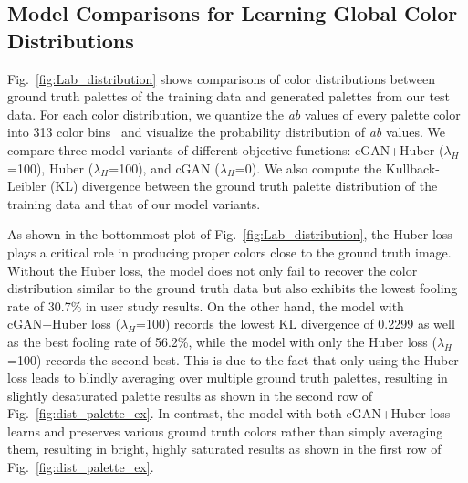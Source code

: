 \documentclass[runningheads]{llncs}
\begin{document}
\subsection{Model Comparisons for Learning Global Color Distributions}
Fig.~\ref{fig:Lab_distribution} shows comparisons of color distributions between ground truth palettes of the training data and generated palettes from our test data. For each color distribution, we quantize the \emph{ab} values of every palette color into 313 color bins~\cite{zhang2016colorful} and visualize the probability distribution of \emph{ab} values. We compare three model variants of different objective functions: cGAN+Huber ($\lambda_{H}$=100), Huber ($\lambda_{H}$=100), and cGAN ($\lambda_{H}$=0). We also compute the Kullback-Leibler (KL) divergence between the ground truth palette distribution of the training data and that of our model variants. 

As shown in the bottommost plot of Fig.~\ref{fig:Lab_distribution}, the Huber loss plays a critical role in producing proper colors close to the ground truth image. Without the Huber loss, the model does not only fail to recover the color distribution similar to the ground truth data but also exhibits the lowest fooling rate of 30.7\% in user study results. On the other hand, the model with cGAN+Huber loss ($\lambda_{H}$=100) records the lowest KL divergence of 0.2299 as well as the best fooling rate of 56.2\%, while the model with only the Huber loss ($\lambda_{H}$=100) records the second best. This is due to the fact that only using the Huber loss leads to blindly averaging over multiple ground truth palettes, resulting in slightly desaturated palette results as shown in the second row of Fig.~\ref{fig:dist_palette_ex}. In contrast, the model with both cGAN+Huber loss learns and preserves various ground truth colors rather than simply averaging them, resulting in bright, highly saturated results as shown in the first row of Fig.~\ref{fig:dist_palette_ex}.
\end{document}
